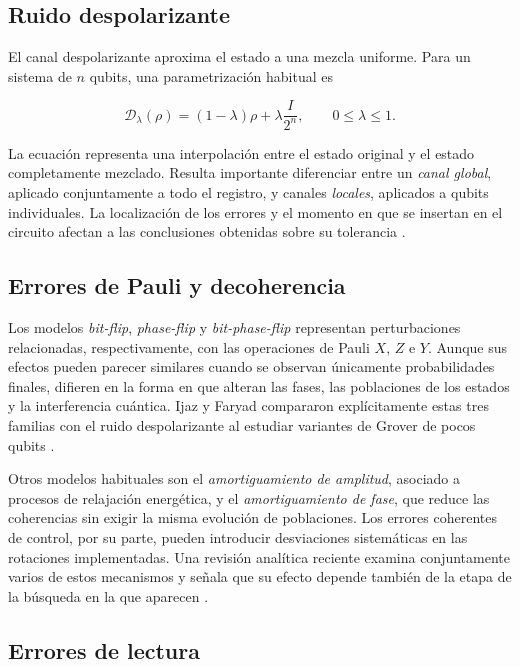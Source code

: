 \documentclass[11pt,a4paper]{article}
\begin{document}
\subsection{Ruido despolarizante}

El canal despolarizante aproxima el estado a una mezcla uniforme. Para un sistema de $n$ qubits, una parametrización habitual es

\begin{equation}
    \mathcal{D}_{\lambda}(\rho)=(1-\lambda)\rho+
    \lambda\frac{I}{2^n},\qquad 0\leq\lambda\leq 1.
    \label{eq:despolarizante}
\end{equation}

La ecuación representa una interpolación entre el estado original y el estado completamente mezclado. Resulta importante diferenciar entre un \emph{canal global}, aplicado conjuntamente a todo el registro, y canales \emph{locales}, aplicados a qubits individuales. La localización de los errores y el momento en que se insertan en el circuito afectan a las conclusiones obtenidas sobre su tolerancia \cite{cohn2016}.

\subsection{Errores de Pauli y decoherencia}

Los modelos \emph{bit-flip}, \emph{phase-flip} y \emph{bit-phase-flip} representan perturbaciones relacionadas, respectivamente, con las operaciones de Pauli $X$, $Z$ e $Y$. Aunque sus efectos pueden parecer similares cuando se observan únicamente probabilidades finales, difieren en la forma en que alteran las fases, las poblaciones de los estados y la interferencia cuántica. Ijaz y Faryad compararon explícitamente estas tres familias con el ruido despolarizante al estudiar variantes de Grover de pocos qubits \cite{ijaz2023}.

Otros modelos habituales son el \emph{amortiguamiento de amplitud}, asociado a procesos de relajación energética, y el \emph{amortiguamiento de fase}, que reduce las coherencias sin exigir la misma evolución de poblaciones. Los errores coherentes de control, por su parte, pueden introducir desviaciones sistemáticas en las rotaciones implementadas. Una revisión analítica reciente examina conjuntamente varios de estos mecanismos y señala que su efecto depende también de la etapa de la búsqueda en la que aparecen \cite{khan2026}.

\subsection{Errores de lectura}
\end{document}
